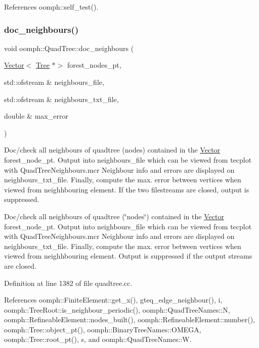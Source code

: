 References oomph\+::self\+\_\+test().

\mbox{\label{classoomph_1_1QuadTree_a5ac5d2986010c9ab152622adb9f6129b}} 
\subsubsection{\texorpdfstring{doc\+\_\+neighbours()}{doc\_neighbours()}}
{\footnotesize\ttfamily void oomph\+::\+Quad\+Tree\+::doc\+\_\+neighbours (\begin{DoxyParamCaption}\item[{\hyperlink{classoomph_1_1Vector}{Vector}$<$ \hyperlink{classoomph_1_1Tree}{Tree} $\ast$$>$}]{forest\+\_\+nodes\+\_\+pt,  }\item[{std\+::ofstream \&}]{neighbours\+\_\+file,  }\item[{std\+::ofstream \&}]{neighbours\+\_\+txt\+\_\+file,  }\item[{double \&}]{max\+\_\+error }\end{DoxyParamCaption})\hspace{0.3cm}{\ttfamily [static]}}



Doc/check all neighbours of quadtree (nodes) contained in the \hyperlink{classoomph_1_1Vector}{Vector} forest\+\_\+node\+\_\+pt. Output into neighbours\+\_\+file which can be viewed from tecplot with Quad\+Tree\+Neighbours.\+mcr Neighbour info and errors are displayed on neighbours\+\_\+txt\+\_\+file. Finally, compute the max. error between vertices when viewed from neighhbouring element. If the two filestreams are closed, output is suppressed. 

Doc/check all neighbours of quadtree (\char`\"{}nodes\char`\"{}) contained in the \hyperlink{classoomph_1_1Vector}{Vector} forest\+\_\+node\+\_\+pt. Output into neighbours\+\_\+file which can be viewed from tecplot with Quad\+Tree\+Neighbours.\+mcr Neighbour info and errors are displayed on neighbours\+\_\+txt\+\_\+file. Finally, compute the max. error between vertices when viewed from neighhbouring element. Output is suppressed if the output streams are closed. 

Definition at line 1382 of file quadtree.\+cc.



References oomph\+::\+Finite\+Element\+::get\+\_\+x(), gteq\+\_\+edge\+\_\+neighbour(), i, oomph\+::\+Tree\+Root\+::is\+\_\+neighbour\+\_\+periodic(), oomph\+::\+Quad\+Tree\+Names\+::N, oomph\+::\+Refineable\+Element\+::nodes\+\_\+built(), oomph\+::\+Refineable\+Element\+::number(), oomph\+::\+Tree\+::object\+\_\+pt(), oomph\+::\+Binary\+Tree\+Names\+::\+O\+M\+E\+GA, oomph\+::\+Tree\+::root\+\_\+pt(), s, and oomph\+::\+Quad\+Tree\+Names\+::W.



